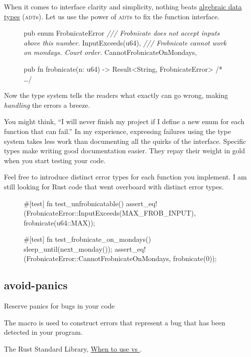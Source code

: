 \documentclass{article}
\begin{document}
When it comes to interface clarity and simplicity, nothing beats \href{https://en.wikipedia.org/wiki/Algebraic_data_type}{algebraic data types} (\textsc{adt}s).
Let us use the power of \textsc{adt}s to fix the  function interface.

\begin{figure}
\begin{code}[good]
pub enum FrobnicateError {
  \emph{/// Frobnicate does not accept inputs above this number.}
  InputExceeds(u64),
  \emph{/// Frobnicate cannot work on mondays. Court order.}
  CannotFrobnicateOnMondays,
}

pub fn frobnicate(n: u64) -> Result<String, FrobnicateError> { /* \ldots  */ }
\end{code}
\end{figure}


Now the type system tells the readers what exactly can go wrong, making \emph{handling} the errors a breeze.

You might think, ``I will never finish my project if I define a new enum for each function that can fail.''
In my experience, expressing failures using the type system takes less work than documenting all the quirks of the interface.
Specific types make writing good documentation easier.
They repay their weight in gold when you start testing your code.

Feel free to introduce distinct error types for each function you implement.
I am still looking for Rust code that went overboard with distinct error types.

\begin{figure}
\begin{code}[good]
#[test]
fn test_unfrobnicatable() {
  assert_eq!(FrobnicateError::InputExceeds(MAX_FROB_INPUT), frobnicate(u64::MAX));
}

#[test]
fn test_frobnicate_on_mondays() {
  sleep_until(next_monday());
  assert_eq!(FrobnicateError::CannotFrobnicateOnMondays, frobnicate(0));
}
\end{code}
\end{figure}

\subsection{avoid-panics}{Reserve panics for bugs in your code}
\epigraph{
  The  macro is used to construct errors that represent a bug that has been detected in your program.
}{The Rust Standard Library, \href{https://doc.rust-lang.org/std/macro.panic.html#when-to-use-panic-vs-result}{When to use  vs }.}
\end{document}
